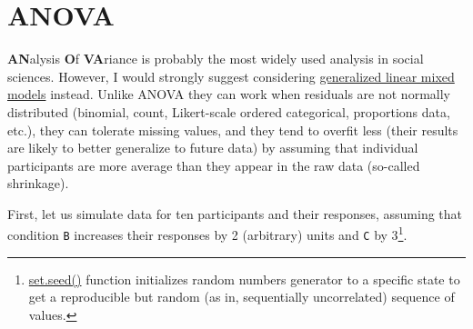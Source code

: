 \documentclass[
]{book}
\begin{document}
\hypertarget{anova}{%
\section{ANOVA}\label{anova}}

\textbf{AN}alysis \textbf{O}f \textbf{VA}riance is probably the most widely used analysis in social sciences. However, I would strongly suggest considering \protect\hyperlink{GLMM}{generalized linear mixed models} instead. Unlike ANOVA they can work when residuals are not normally distributed (binomial, count, Likert-scale ordered categorical, proportions data, etc.), they can tolerate missing values, and they tend to overfit less (their results are likely to better generalize to future data) by assuming that individual participants are more average than they appear in the raw data (so-called shrinkage).

First, let us simulate data for ten participants and their responses, assuming that condition \texttt{B} increases their responses by 2 (arbitrary) units and \texttt{C} by 3\footnote{\href{https://stat.ethz.ch/R-manual/R-devel/library/base/html/Random.html}{set.seed()} function initializes random numbers generator to a specific state to get a reproducible but random (as in, sequentially uncorrelated) sequence of values.}.
\end{document}
